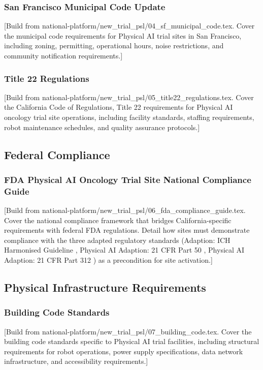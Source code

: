 \subsubsection{San Francisco Municipal Code Update}
[Build from national-platform/new\_trial\_psl/04\_sf\_municipal\_code.tex. Cover
the municipal code requirements for Physical AI trial sites in San Francisco,
including zoning, permitting, operational hours, noise restrictions, and
community notification requirements.]

\subsubsection{Title 22 Regulations}
[Build from national-platform/new\_trial\_psl/05\_title22\_regulations.tex.
Cover the California Code of Regulations, Title 22 requirements for Physical
AI oncology trial site operations, including facility standards, staffing
requirements, robot maintenance schedules, and quality assurance protocols.]

\subsection{Federal Compliance}
\label{subsec:site-federal}

\subsubsection{FDA Physical AI Oncology Trial Site National Compliance Guide}
[Build from national-platform/new\_trial\_psl/06\_fda\_compliance\_guide.tex.
Cover the national compliance framework that bridges California-specific
requirements with federal FDA regulations. Detail how sites must demonstrate
compliance with the three adapted regulatory standards (Adaption: ICH
Harmonised Guideline \cite{ich-adapt}, Physical AI Adaption: 21 CFR Part 50
\cite{cfr50-adapt}, Physical AI Adaption: 21 CFR Part 312 \cite{cfr312-adapt})
as a precondition for site activation.]

\subsection{Physical Infrastructure Requirements}
\label{subsec:site-infrastructure}

\subsubsection{Building Code Standards}
[Build from national-platform/new\_trial\_psl/07\_building\_code.tex. Cover
the building code standards specific to Physical AI trial facilities,
including structural requirements for robot operations, power supply
specifications, data network infrastructure, and accessibility requirements.]


